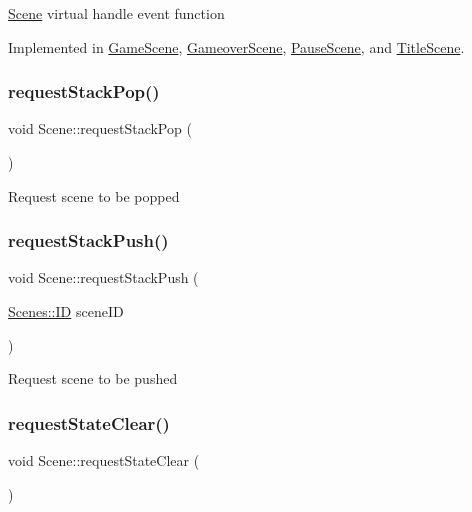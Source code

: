 \hyperlink{class_scene}{Scene} virtual handle event function 

Implemented in \hyperlink{class_game_scene_aa494372b1f451f3c3a268558fddb30f2}{Game\+Scene}, \hyperlink{class_gameover_scene_ac951bc51d29e2d14807e3da2e885ccc8}{Gameover\+Scene}, \hyperlink{class_pause_scene_adeb06e37e0a2afa297ddbe795c3cbe94}{Pause\+Scene}, and \hyperlink{class_title_scene_a1f019a83309ce967883b4b4d76b816af}{Title\+Scene}.

\mbox{\label{class_scene_ad2f2093a8adc09c11e89cda6f94a3dd1}} 
\subsubsection{\texorpdfstring{request\+Stack\+Pop()}{requestStackPop()}}
{\footnotesize\ttfamily void Scene\+::request\+Stack\+Pop (\begin{DoxyParamCaption}{ }\end{DoxyParamCaption})\hspace{0.3cm}{\ttfamily [protected]}}

Request scene to be popped \mbox{\label{class_scene_a38d36125a421eab649188edb740d1c36}} 
\subsubsection{\texorpdfstring{request\+Stack\+Push()}{requestStackPush()}}
{\footnotesize\ttfamily void Scene\+::request\+Stack\+Push (\begin{DoxyParamCaption}\item[{\hyperlink{namespace_scenes_a0ad7ab6856b1d77d498e3a251f6bb275}{Scenes\+::\+ID}}]{scene\+ID }\end{DoxyParamCaption})\hspace{0.3cm}{\ttfamily [protected]}}

Request scene to be pushed \mbox{\label{class_scene_a0cc91a92f27ba281b52c58168b7a000a}} 
\subsubsection{\texorpdfstring{request\+State\+Clear()}{requestStateClear()}}
{\footnotesize\ttfamily void Scene\+::request\+State\+Clear (\begin{DoxyParamCaption}{ }\end{DoxyParamCaption})\hspace{0.3cm}{\ttfamily [protected]}}

